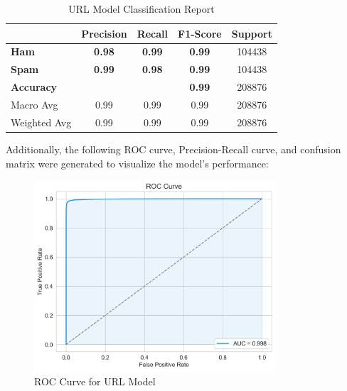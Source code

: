 \documentclass{article}
\begin{document}
\begin{table}[htbp]
    \centering
    \caption{URL Model Classification Report}
    \begin{tabular}{l c c c c}
    \toprule
     & \textbf{Precision} & \textbf{Recall} & \textbf{F1-Score} & Support \\
    \midrule
    \textbf{Ham} & \textbf{0.98} & \textbf{0.99} & \textbf{0.99} & 104438 \\
    \textbf{Spam} & \textbf{0.99} & \textbf{0.98} & \textbf{0.99} & 104438 \\
    \midrule
    \textbf{Accuracy} & & & \textbf{0.99} & 208876 \\
    Macro Avg & 0.99 & 0.99 & 0.99 & 208876 \\
    Weighted Avg & 0.99 & 0.99 & 0.99 & 208876 \\
    \bottomrule
    \end{tabular}
    \label{tab:classification_report}
\end{table}

\noindent
Additionally, the following ROC curve, Precision-Recall curve, and confusion matrix were generated to visualize the model's performance:


\begin{figure}[htbp]
    \centering
    \includegraphics[width=0.8\textwidth]{../analysis/url/roc_curve.png}
    \caption{ROC Curve for URL Model}
    \label{fig:roc_curve_1}
\end{figure}
\end{document}
